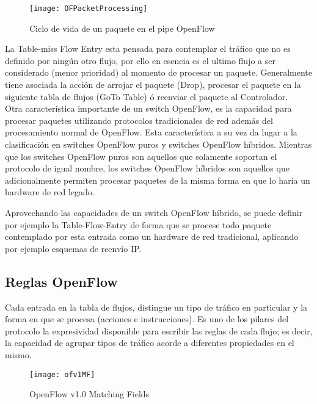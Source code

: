 \begin{figure}[htbp!] 
\centering    
\texttt{[image: OFPacketProcessing]}
\caption[Ciclo de vida de un paquete en pipe OpenFlow]{Ciclo de vida de un paquete en el pipe OpenFlow}
\label{fig:OFPacketProcessing}
\end{figure}


La Table-miss Flow Entry esta pensada para contemplar el tr\'afico que no es definido por ningún otro flujo, por ello en esencia es el ultimo flujo a ser considerado (menor prioridad) al momento de procesar un paquete. Generalmente tiene asociada la acción de arrojar el paquete (Drop), procesar el paquete en la siguiente tabla de flujos (GoTo Table) \'o reenviar el paquete al Controlador.\\

Otra caracter\'istica importante de un switch OpenFlow, es la capacidad para procesar paquetes utilizando protocolos tradicionales de red adem\'as del procesamiento normal de OpenFlow. Esta característica a su vez da lugar a la clasificaci\'on en switches OpenFlow puros y switches OpenFlow h\'ibridos. Mientras que los switches OpenFlow puros son aquellos que solamente soportan el protocolo de igual nombre, los switches OpenFlow h\'ibridos son aquellos que adicionalmente permiten procesar paquetes de la misma forma en que lo har\'ia un hardware de red legado.

Aprovechando las capacidades de un switch OpenFlow h\'ibrido, se puede definir por ejemplo la Table-Flow-Entry de forma que se procese todo paquete contemplado por esta entrada como un hardware de red tradicional, aplicando por ejemplo esquemas de reenvío IP. 

\subsection{Reglas OpenFlow}
Cada entrada en la tabla de flujos, distingue un tipo de tr\'afico en particular y la forma en que se procesa (acciones e instrucciones). Es uno de los pilares del protocolo la expresividad disponible para escribir las reglas de cada flujo; es decir, la capacidad de agrupar tipos de tr\'afico acorde a diferentes propiedades en el mismo.\\

\begin{figure}[h] 
\centering    
\texttt{[image: ofv1MF]}
\caption[OF 1.0 Matching Fields]{OpenFlow v1.0 Matching Fields}
\label{fig:OF10MatchingFields}
\end{figure}

